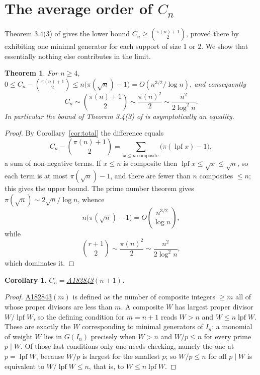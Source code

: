 \documentclass[a4paper,11pt,oneside,reqno]{amsart}
\theoremstyle{definition}
\theoremstyle{remark}
\theoremstyle{plain}
\newtheorem{theorem}[definition]{Theorem}
\newtheorem{corollary}[definition]{Corollary}
\newcommand{\lpf}{\operatorname{lpf}}
\newcommand{\seqnum}[1]{\href{https://oeis.org/#1}{\underline{#1}}}
\begin{document}
\section{The average order of \texorpdfstring{\(C_n\)}{C\_n}}\label{sec:asymptotics}

Theorem 3.4(3) of \cite{Snellman2000} gives the lower bound
\(C_n \ge \binom{\pi(n)+1}{2}\), proved there by exhibiting one minimal generator
for each support of size \(1\) or \(2\). We show that essentially nothing else
contributes in the limit.

\begin{theorem}\label{thm:asymp}
  For \(n \ge 4\),
  \(\displaystyle 0 \le C_n-\binom{\pi(n)+1}{2} \le n\bigl(\pi(\sqrt n)-1\bigr)
    =O\!\left(n^{3/2}/\log n\right)\), and consequently
  \[
    C_n \sim \binom{\pi(n)+1}{2} \sim \frac{\pi(n)^{2}}{2} \sim \frac{n^{2}}{2\log^{2}n}.
  \]
  In particular the bound of Theorem 3.4(3) of \cite{Snellman2000} is
  asymptotically an equality.
\end{theorem}

\begin{proof}
  By Corollary~\ref{cor:total} the difference equals
  \[
    C_n-\binom{\pi(n)+1}{2} = \sum_{x \le n\text{ composite}}\bigl(\pi(\lpf x)-1\bigr),
  \]
  a sum of non-negative terms. If \(x \le n\) is composite then
  \(\lpf x \le \sqrt x \le \sqrt n\), so each term is at most \(\pi(\sqrt n)-1\), and
  there are fewer than \(n\) composites \(\le n\); this gives the upper bound.
  The prime number theorem gives \(\pi(\sqrt n) \sim 2\sqrt n/\log n\), whence
  \[
    n\bigl(\pi(\sqrt n)-1\bigr) = O\!\left(\frac{n^{3/2}}{\log n}\right),
  \]
  while
  \[
    \binom{r+1}{2} \sim \frac{\pi(n)^{2}}{2} \sim \frac{n^{2}}{2\log^{2}n},
  \]
  which dominates it.
\end{proof}

\begin{corollary}
  \(C_n=\)\;\seqnum{A182843}\((n+1)\).
\end{corollary}

\begin{proof}
  \seqnum{A182843}\((m)\) is defined as the number of composite integers
  \(\ge m\) all of whose proper divisors are less than \(m\). A composite \(W\)
  has largest proper divisor \(W/\lpf W\), so the defining condition for
  \(m = n+1\) reads \(W > n\) and \(W \le n\lpf W\). These are exactly the \(W\)
  corresponding to minimal generators of \(I_n\): a monomial of weight \(W\)
  lies in \(G(I_n)\) precisely when \(W > n\) and \(W/p \le n\) for every prime
  \(p \mid W\). Of those last conditions only one needs checking, namely the one
  at \(p = \lpf W\), because \(W/p\) is largest for the smallest \(p\); so
  \(W/p \le n\) for all \(p \mid W\) is equivalent to \(W/\lpf W \le n\), that is,
  to \(W \le n\lpf W\).
\end{proof}
\end{document}
